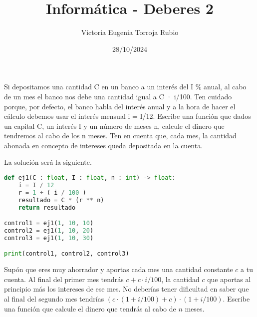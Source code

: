 \documentclass{article}
\begin{document}
\title{Informática - Deberes 2}
\author{Victoria Eugenia Torroja Rubio}
\date{28/10/2024}

\maketitle

\begin{ej}
Si depositamos una cantidad C en un banco a un interés del I \% anual, al cabo de un mes el banco nos debe una cantidad igual a C · i/100. Ten cuidado porque, por defecto, el banco habla del interés anual y a la hora de hacer el cálculo debemos usar el interés mensual i = I/12.
Escribe una función que dados un capital C, un interés I y un número de meses n, calcule el dinero que tendremos al cabo de los n meses. Ten en cuenta que, cada mes, la cantidad abonada en concepto de intereses queda depositada en la cuenta.
\end{ej}

\begin{sol}
La solución será la siguiente. 
\begin{lstlisting}[language = Python]
def ej1(C : float, I : float, n : int) -> float:
    i = I / 12
    r = 1 + ( i / 100 )
    resultado = C * (r ** n)
    return resultado

control1 = ej1(1, 10, 10)
control2 = ej1(1, 10, 20)
control3 = ej1(1, 10, 30)

print(control1, control2, control3)
\end{lstlisting}
\end{sol}

\begin{ej}
Supón que eres muy ahorrador y aportas cada mes una cantidad constante $\displaystyle c $ a tu cuenta. Al final del primer mes tendrás $\displaystyle c + c \cdot i / 100 $, la cantidad $\displaystyle c $ que aportas al principio más los intereses de ese mes. No deberías tener dificultad en saber que al final del segundo mes tendrías $\displaystyle \left(c \cdot \left(1 + i / 100\right)+c\right) \cdot \left(1 + i / 100\right) $. Escribe una función que calcule el dinero que tendrás al cabo de $\displaystyle n $ meses.
\end{ej}
\end{document}
